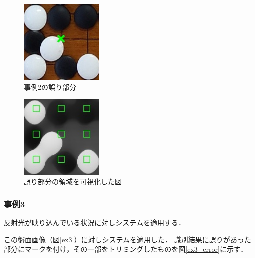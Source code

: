 \documentclass[openright]{nitocs}
\numberwithin{equation}{section}
\begin{document}
                \begin{figure}[tb] %
                    \begin{center}
                    \includegraphics[clip,width=40mm]{DSC_0099/TRIM_resultCompare.jpg} 
                    \caption{事例2の誤り部分}
                    \label{ex2_error}
                    \end{center}
                \end{figure}

                \begin{figure}[tb] %
                    \begin{center}
                    \includegraphics[clip,width=40mm]{DSC_0099/TRIM_boardWithAreaImg.jpg} 
                    \caption{誤り部分の領域を可視化した図}
                    \label{ex2_error_area}
                    \end{center}
                \end{figure}

            \subsubsection{事例3} %
                反射光が映り込んでいる状況に対しシステムを適用する．

                この盤面画像（図\ref{ex3}）に対しシステムを適用した．
                識別結果に誤りがあった部分にマークを付け，その一部をトリミングしたものを図\ref{ex3_error}に示す．
\end{document}
